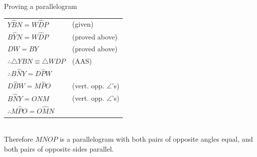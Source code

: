 \begin{wex}{Proving a parallelogram}
{\begin{tabular}{ll}
$Y\hat{B}N = W\hat{D}P$ & (given) \\
$B\hat{Y}N = W\hat{D}P$ & (proved above) \\
$DW = BY$ & (proved above) \\
$\therefore \triangle YBN \equiv \triangle WDP$ & (AAS) \\
$\therefore B\hat{N}Y = D\hat{P}W$ & \\
$D\hat{B}W = M\hat{P}O$ & (vert. opp. $\angle$'s) \\
$B\hat{N}Y = O\hat{N}M$ & (vert. opp. $\angle$'s) \\
$\therefore M\hat{P}O = O\hat{M}N$ & \\
\end{tabular}\\ \newline
Therefore $MNOP$ is a parallelogram with both pairs of opposite angles equal, and both pairs of opposite sides parallel.
}
\end{wex}


